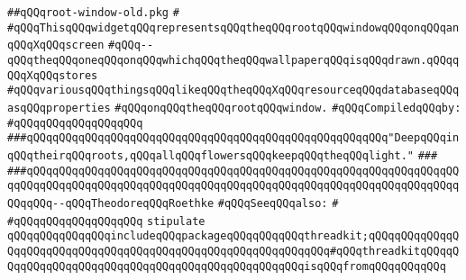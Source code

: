 \label{src/lib/x-kit/widget/old/basic/root-window-old.pkg}
\verb|##qQQqroot-window-old.pkg|\newline
\verb|#|\newline
\verb|#qQQqThisqQQqwidgetqQQqrepresentsqQQqtheqQQqrootqQQqwindowqQQqonqQQqanqQQqXqQQqscreen|\newline
\verb|#qQQq--qQQqtheqQQqoneqQQqonqQQqwhichqQQqtheqQQqwallpaperqQQqisqQQqdrawn.qQQqqQQqXqQQqstores|\newline
\verb|#qQQqvariousqQQqthingsqQQqlikeqQQqtheqQQqXqQQqresourceqQQqdatabaseqQQqasqQQqproperties|\newline
\verb|#qQQqonqQQqtheqQQqrootqQQqwindow.|\newline
\newline
\verb|#qQQqCompiledqQQqby:|\newline
\verb|#qQQqqQQqqQQqqQQqqQQq|\newline
\newline
\newline
\newline
\newline
\verb|###qQQqqQQqqQQqqQQqqQQqqQQqqQQqqQQqqQQqqQQqqQQqqQQqqQQqqQQq"DeepqQQqinqQQqtheirqQQqroots,qQQqallqQQqflowersqQQqkeepqQQqtheqQQqlight."|\newline
\verb|###|\newline
\verb|###qQQqqQQqqQQqqQQqqQQqqQQqqQQqqQQqqQQqqQQqqQQqqQQqqQQqqQQqqQQqqQQqqQQqqQQqqQQqqQQqqQQqqQQqqQQqqQQqqQQqqQQqqQQqqQQqqQQqqQQqqQQqqQQqqQQqqQQqqQQqqQQq--qQQqTheodoreqQQqRoethke|\newline
\newline
\newline
\verb|#qQQqSeeqQQqalso:|\newline
\verb|#|\newline
\verb|#qQQqqQQqqQQqqQQqqQQq|\newline
\newline
\verb|stipulate|\newline
\verb|qQQqqQQqqQQqqQQqincludeqQQqpackageqQQqqQQqqQQqthreadkit;qQQqqQQqqQQqqQQqqQQqqQQqqQQqqQQqqQQqqQQqqQQqqQQqqQQqqQQqqQQqqQQq#qQQqthreadkitqQQqqQQqqQQqqQQqqQQqqQQqqQQqqQQqqQQqqQQqqQQqqQQqqQQqisqQQqfromqQQqqQQqqQQq|\newline
